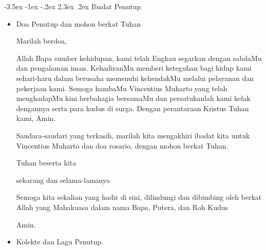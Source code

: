 \documentclass[a5paper,titlepage,12pt]{scrbook}
\makeatletter
\renewcommand{\section}{\@startsection {section}{1}{\z@}%
                                   {-3.5ex \@plus -1ex \@minus -.2ex}%
                                   {2.3ex \@plus.2ex}%
                                   {\normalfont\normalsize\bfseries}}
\newcommand{\arwah}{Vincentius Muharto }
\makeatother
\begin{document}
\section{Ibadat Penutup}
\begin{itemize}
\item Doa Penutup dan mohon berkat Tuhan

	Marilah berdoa,

Allah Bapa sumber kehidupan, kami telah Engkau segarkan dengan sabdaMu dan pengalaman iman. KehadiranMu memberi keteguhan bagi hidup kami sehari-haru dalam berusaha memenuhi kehendakMu melalui pelayanan dan  pekerjaan kami. Semoga hambaMu \arwah yang telah menghadapMu kini berbahagia bersamaMu dan persatukanlah kami kelak dengannya serta para kudus di surga. Dengan perantaraan Kristus Tuhan kami, Amin.

Saudara-saudari yang terkasih, marilah kita mengakhiri ibadat kita untuk \arwah dan doa rosario, dengan mohon berkat Tuhan.

Tuhan beserta kita

sekarang dan selama-lamanya

Semoga kita sekalian yang hadir di sini, dilindungi dan dibimbing oleh berkat Allah yang Mahakuasa dalam nama Bapa, Putera, dan Roh Kudus

Amin.

\item Kolekte dan Lagu Penutup. 
\end{itemize}
\end{document}

